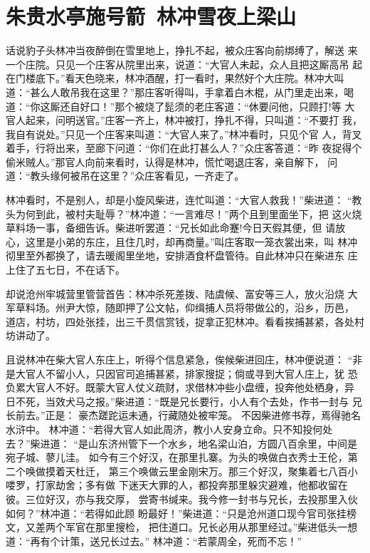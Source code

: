 \chapter{朱贵水亭施号箭~林冲雪夜上梁山}

话说豹子头林冲当夜醉倒在雪里地上，挣扎不起，被众庄客向前绑缚了，解送
来一个庄院。只见一个庄客从院里出来，说道：“大官人未起，众人且把这厮高吊
起在门楼底下。”看天色晓来，林冲酒醒，打一看时，果然好个大庄院。林冲大叫
道：“甚么人敢吊我在这里？”那庄客听得叫，手拿着白木棍，从门里走出来，喝
道：“你这厮还自好口！”那个被烧了髭须的老庄客道：“休要问他，只顾打!等
大官人起来，问明送官。”庄客一齐上，林冲被打，挣扎不得，只叫道：“不要打
我，我自有说处。”只见一个庄客来叫道：“大官人来了。”林冲看时，只见个官
人，背叉着手，行将出来，至廊下问道：“你们在此打甚么人？”众庄客答道：“昨
夜捉得个偷米贼人。”那官人向前来看时，认得是林冲，慌忙喝退庄客，亲自解下，
问道：“教头缘何被吊在这里？”众庄客看见，一齐走了。

林冲看时，不是别人，却是小旋风柴进，连忙叫道：“大官人救我！”柴进道：
“教头为何到此，被村夫耻辱？”林冲道：“一言难尽！”两个且到里面坐下，把
这火烧草料场一事，备细告诉。柴进听罢道：“兄长如此命蹇!今日天假其便，但
请放心，这里是小弟的东庄，且住几时，却再商量。”叫庄客取一笼衣裳出来，叫
林冲彻里至外都换了，请去暖阁里坐地，安排酒食杯盘管待。自此林冲只在柴进东
庄上住了五七日，不在话下。

却说沧州牢城营里管营首告：林冲杀死差拨、陆虞候、富安等三人，放火沿烧
大军草料场。州尹大惊，随即押了公文帖，仰缉捕人员将带做公的，沿乡，历邑，
道店，村坊，四处张挂，出三千贯信赏钱，捉拿正犯林冲。看看挨捕甚紧，各处村
坊讲动了。

且说林冲在柴大官人东庄上，听得个信息紧急，俟候柴进回庄，林冲便说道：
“非是大官人不留小人，只因官司追捕甚紧，排家搜捉；倘或寻到大官人庄上，犹
恐负累大官人不好。既蒙大官人仗义疏财，求借林冲些小盘缠，投奔他处栖身，异
日不死，当效犬马之报。”柴进道：“既是兄长要行，小人有个去处，作书一封与
兄长前去。”正是：
豪杰蹉跎运未通，行藏随处被牢笼。
不因柴进修书荐，焉得驰名水浒中。
林冲道：“若得大官人如此周济，教小人安身立命。只不知投何处去？”柴进道：
“是山东济州管下一个水乡，地名梁山泊，方圆八百余里，中间是宛子城、蓼儿洼。
如今有三个好汉，在那里扎寨。为头的唤做白衣秀士王伦，第二个唤做摸着天杜迁，
第三个唤做云里金刚宋万。那三个好汉，聚集着七八百小喽罗，打家劫舍；多有做
下迷天大罪的人，都投奔那里躲灾避难，他都收留在彼。三位好汉，亦与我交厚，
尝寄书缄来。我今修一封书与兄长，去投那里入伙如何？”林冲道：“若得如此顾
盼最好！”柴进道：“只是沧州道口现今官司张挂榜文，又差两个军官在那里搜检，
把住道口。兄长必用从那里经过。”柴进低头一想道：“再有个计策，送兄长过去。”
林冲道：“若蒙周全，死而不忘！”

